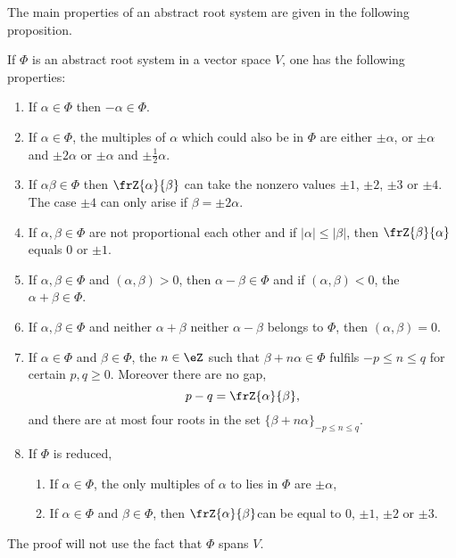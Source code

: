 The main properties of an abstract root system are given in the  following proposition.
\begin{proposition}     \label{PropPropAbstrRootviiiikl}
	If $\Phi$ is an abstract root system in a vector space $V$, one has the following properties:

	\begin{enumerate}
		\item\label{enubi} If $\alpha\in\Phi$ then $-\alpha\in\Phi$.

		\item\label{enubii} If $\alpha\in\Phi$, the multiples of $\alpha$ which could also be in $\Phi$ are either $\pm\alpha$, or $\pm\alpha$ and $\pm 2\alpha$ or $\pm\alpha$ and $\pm\frac{1}{2}\alpha$.

		\item\label{enubiii} If $\alpha\beta\in\Phi$ then $\frZ{\alpha}{\beta}$ can take the nonzero values $\pm 1$, $\pm 2$, $\pm 3$ or $\pm 4$. The case $\pm 4$ can only arise if $\beta=\pm 2\alpha$.

		\item\label{enubiv} If $\alpha,\beta\in\Phi$ are not proportional each other and if $|\alpha|\leq|\beta|$, then $\frZ{\beta}{\alpha}$ equals $0$ or $\pm 1$.

		\item\label{enubv} If $\alpha,\beta\in\Phi$ and $(\alpha,\beta)>0$, then $\alpha-\beta\in\Phi$ and if $(\alpha,\beta)<0$, the $\alpha+\beta\in\Phi$.

		\item\label{enubvi} If $\alpha,\beta\in\Phi$ and neither $\alpha+\beta$ neither $\alpha-\beta$ belongs to $\Phi$, then $(\alpha,\beta)=0$.

		\item\label{enubvii} If $\alpha\in\Phi$ and $\beta\in\Phi$, the $n\in\eZ$ such that $\beta+n\alpha\in\Phi$ fulfils $-p\leq n\leq q$ for certain $p,q\geq 0$. Moreover there are no gap,
		\[
			p-q=\frZ{\alpha}{\beta},
		\]
		and there are at most four roots in the set $\{\beta+n\alpha\}_{-p\leq n\leq q}$.

		\item\label{enubviii} If $\Phi$ is reduced,

		\begin{enumerate}
			\item\label{enubviiia} If $\alpha\in\Phi$, the only multiples of $\alpha$ to lies in $\Phi$ are $\pm\alpha$,
			\item\label{enubviiib} If $\alpha\in\Phi$ and $\beta\in\Phi$, then $\frZ{\alpha}{\beta}$can be equal to $0$, $\pm 1$, $\pm 2$ or $\pm 3$.
		\end{enumerate}
	\end{enumerate} \label{prop:Cartan_matr}
\end{proposition}
The proof will not use the fact that $\Phi$ spans $V$.

